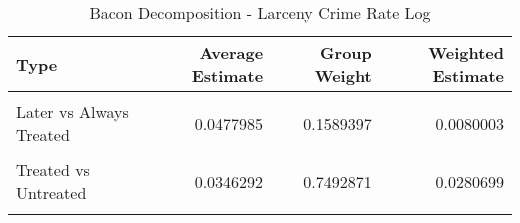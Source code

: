 \begin{table}[H]

\caption{\label{tab:tab:bacondecompositionLarceny}Bacon Decomposition - Larceny Crime Rate Log}
\centering
\begin{tabular}[t]{lrrr}
\toprule
Type & Average Estimate & Group Weight & Weighted Estimate\\
\midrule
\cellcolor{gray!6}{Earlier vs Later Treated} & \cellcolor{gray!6}{0.0088734} & \cellcolor{gray!6}{0.0683810} & \cellcolor{gray!6}{-0.0004160}\\
Later vs Always Treated & 0.0477985 & 0.1589397 & 0.0080003\\
\cellcolor{gray!6}{Later vs Earlier Treated} & \cellcolor{gray!6}{0.0616798} & \cellcolor{gray!6}{0.0233921} & \cellcolor{gray!6}{0.0004859}\\
Treated vs Untreated & 0.0346292 & 0.7492871 & 0.0280699\\
\cellcolor{gray!6}{Total TWFE} & \cellcolor{gray!6}{NaN} & \cellcolor{gray!6}{NaN} & \cellcolor{gray!6}{0.0361400}\\
\bottomrule
\end{tabular}
\end{table}
